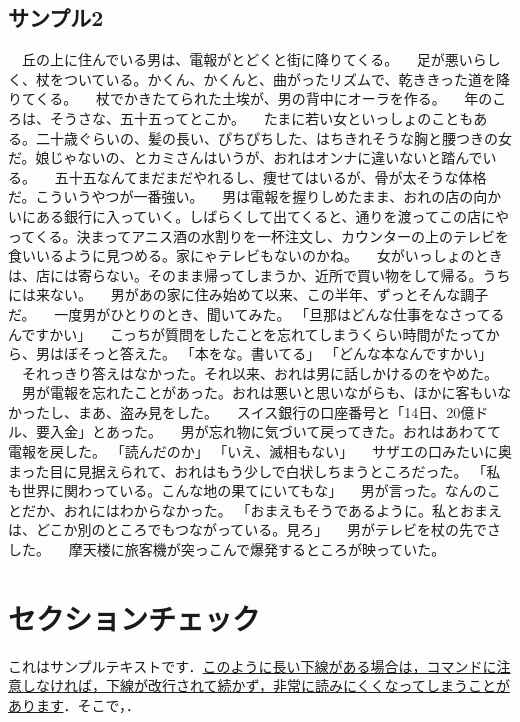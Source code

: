 \documentclass[11pt,a4paper,openright]{ltjsbook}
\begin{document}
\subsection{サンプル2}

　丘の上に住んでいる男は、電報がとどくと街に降りてくる。
　足が悪いらしく、杖をついている。かくん、かくんと、曲がったリズムで、乾ききった道を降りてくる。
　杖でかきたてられた土埃が、男の背中にオーラを作る。
　年のころは、そうさな、五十五ってとこか。
　たまに若い女といっしょのこともある。二十歳ぐらいの、髪の長い、ぴちぴちした、はちきれそうな胸と腰つきの女だ。娘じゃないの、とカミさんはいうが、おれはオンナに違いないと踏んでいる。
　五十五なんてまだまだやれるし、痩せてはいるが、骨が太そうな体格だ。こういうやつが一番強い。
　男は電報を握りしめたまま、おれの店の向かいにある銀行に入っていく。しばらくして出てくると、通りを渡ってこの店にやってくる。決まってアニス酒の水割りを一杯注文し、カウンターの上のテレビを食いいるように見つめる。家にゃテレビもないのかね。
　女がいっしょのときは、店には寄らない。そのまま帰ってしまうか、近所で買い物をして帰る。うちには来ない。
　男があの家に住み始めて以来、この半年、ずっとそんな調子だ。
　一度男がひとりのとき、聞いてみた。
「旦那はどんな仕事をなさってるんですかい」
　こっちが質問をしたことを忘れてしまうくらい時間がたってから、男はぼそっと答えた。
「本をな。書いてる」
「どんな本なんですかい」
　それっきり答えはなかった。それ以来、おれは男に話しかけるのをやめた。
　男が電報を忘れたことがあった。おれは悪いと思いながらも、ほかに客もいなかったし、まあ、盗み見をした。
　スイス銀行の口座番号と「14日、20億ドル、要入金」とあった。
　男が忘れ物に気づいて戻ってきた。おれはあわてて電報を戻した。
「読んだのか」
「いえ、滅相もない」
　サザエの口みたいに奥まった目に見据えられて、おれはもう少しで白状しちまうところだった。
「私も世界に関わっている。こんな地の果てにいてもな」
　男が言った。なんのことだか、おれにはわからなかった。
「おまえもそうであるように。私とおまえは、どこか別のところでもつながっている。見ろ」
　男がテレビを杖の先でさした。
　摩天楼に旅客機が突っこんで爆発するところが映っていた。

\section{セクションチェック}

これはサンプルテキストです．\uline{このように長い下線がある場合は，コマンドに注意しなければ，下線が改行されて続かず，非常に読みにくくなってしまうことがあります}．そこで，．
\end{document}
